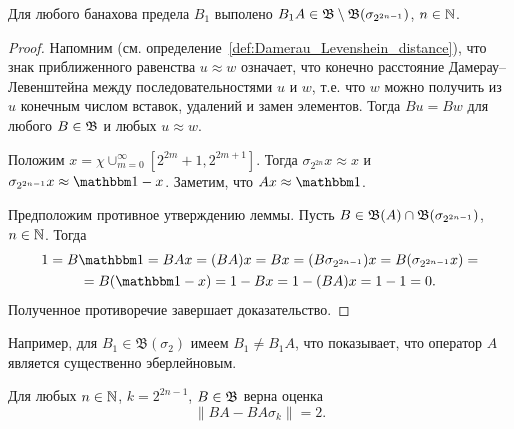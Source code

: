 \begin{proposition}
	Для любого банахова предела $B_1$ выполено $B_1 A \in \mathfrak B \setminus \mathfrak{B} (\sigma_{2^{2n-1}})$, $n\in \mathbb{N}$.
\end{proposition}

\begin{proof}
	Напомним (см. определение~\ref{def:Damerau_Levenshein_distance}), что знак приближенного равенства $ u \approx w$ означает,
	что конечно расстояние Дамерау--Левенштейна между последовательностями
	$u$ и $w$,
	т.е. что $w$ можно получить из $u$ конечным числом вставок, удалений и замен элементов.
	Тогда $Bu = Bw$ для любого $B\in\mathfrak{B}$ и любых $u \approx w$.

	Положим $x = \chi {\cup_{m=0}^{\infty}\left[2^{2 m}+1, 2^{2 m+1}\right]}$.
	Тогда $\sigma_{2^{2n}} x \approx x$ и $\sigma_{2^{2n-1}} x \approx \one - x$.
	Заметим, что $Ax \approx \one$.

	Предположим противное утверждению леммы.
	Пусть $B \in \mathfrak{B}(A) \cap \mathfrak{B} (\sigma_{2^{2n-1}})$, $n\in \mathbb{N}$.
	Тогда
	\begin{multline}
		1 = B\one = BAx = (BA)x = Bx =
		(B\sigma_{2^{2n-1}}) x = B (\sigma_{2^{2n-1}} x) =
		\\=
		B(\one -x) = 1 - Bx = 1 - (BA)x = 1-1 = 0
		.
	\end{multline}
	Полученное противоречие завершает доказательство.
\end{proof}

\begin{remark}
	Например, для $B_1 \in \mathfrak B (\sigma_2)$ имеем $B_1 \ne B_1 A$, что показывает,
	что оператор $A$ является существенно эберлейновым.
\end{remark}

\begin{proposition}
	Для любых $n\in\mathbb{N}$, $k=2^{2n-1}$, $B\in\mathfrak{B}$ верна оценка
	\begin{equation}
		\|BA-BA\sigma_k\| = 2
		.
	\end{equation}
\end{proposition}

